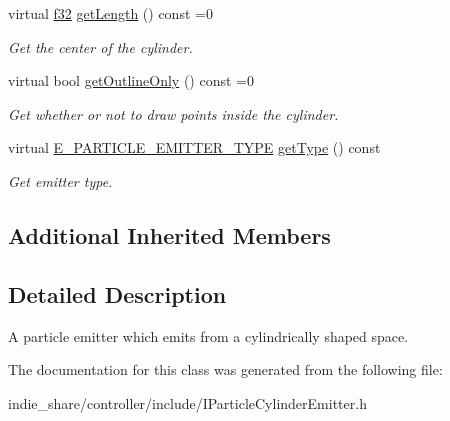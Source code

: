 \begin{DoxyCompactItemize}
\mbox{\label{classirr_1_1scene_1_1IParticleCylinderEmitter_aa69c1478e4b472fbd7940ec6042d7ee8}} 
virtual \hyperlink{namespaceirr_a0277be98d67dc26ff93b1a6a1d086b07}{f32} \hyperlink{classirr_1_1scene_1_1IParticleCylinderEmitter_aa69c1478e4b472fbd7940ec6042d7ee8}{get\+Length} () const =0
\begin{DoxyCompactList}\small\item\em Get the center of the cylinder. \end{DoxyCompactList}\item 
\mbox{\label{classirr_1_1scene_1_1IParticleCylinderEmitter_a624cebc97c4984a6d713d5ae1efe2d8e}} 
virtual bool \hyperlink{classirr_1_1scene_1_1IParticleCylinderEmitter_a624cebc97c4984a6d713d5ae1efe2d8e}{get\+Outline\+Only} () const =0
\begin{DoxyCompactList}\small\item\em Get whether or not to draw points inside the cylinder. \end{DoxyCompactList}\item 
\mbox{\label{classirr_1_1scene_1_1IParticleCylinderEmitter_a644dc9a329d371cc0c1f92212c4f2c60}} 
virtual \hyperlink{namespaceirr_1_1scene_a3e251a881c886884a78adea2e546272b}{E\+\_\+\+P\+A\+R\+T\+I\+C\+L\+E\+\_\+\+E\+M\+I\+T\+T\+E\+R\+\_\+\+T\+Y\+PE} \hyperlink{classirr_1_1scene_1_1IParticleCylinderEmitter_a644dc9a329d371cc0c1f92212c4f2c60}{get\+Type} () const
\begin{DoxyCompactList}\small\item\em Get emitter type. \end{DoxyCompactList}\end{DoxyCompactItemize}
\subsection*{Additional Inherited Members}


\subsection{Detailed Description}
A particle emitter which emits from a cylindrically shaped space. 

The documentation for this class was generated from the following file\+:\begin{DoxyCompactItemize}
\item 
indie\+\_\+share/controller/include/I\+Particle\+Cylinder\+Emitter.\+h\end{DoxyCompactItemize}
